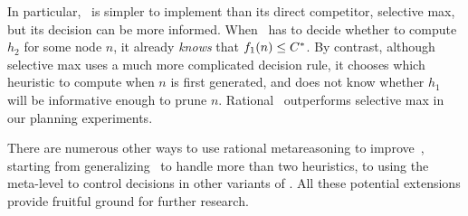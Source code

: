 In particular, \rationallazyastar~is simpler to implement than its direct
competitor, selective max, but its decision can be more informed.  When
\rationallazyastar~has to decide whether to compute $h_2$ for some node
$n$, it already {\em knows} that $f_1(n) \leq C^\ast$.  By contrast,
although selective max uses a much more complicated decision rule, it
chooses which heuristic to compute when $n$ is first generated, and does
not know whether $h_1$ will be informative enough to prune $n$. Rational
\lazyastar~outperforms selective max in our planning experiments.

There are numerous other ways to use rational metareasoning to
improve~\astar, starting from generalizing \rationallazyastar~to
handle more than two heuristics, to using the meta-level to control
decisions in other variants of \astar. All these potential extensions
provide fruitful ground for further research.
